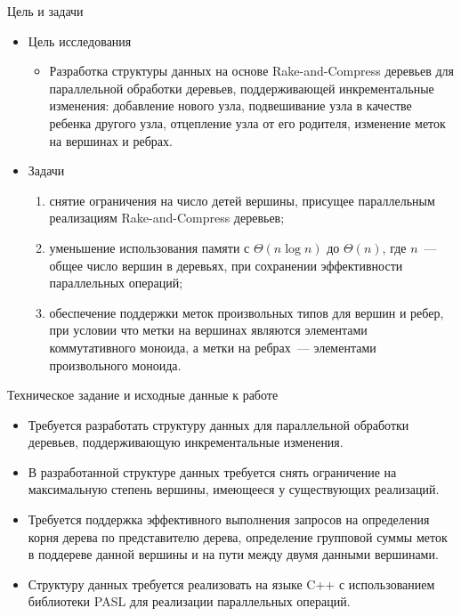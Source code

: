 \documentclass[hyperref=unicode,graphics=pdflatex,13pt]{beamer}
\begin{document}
\begin{frame}[shrink]{Цель и задачи}
\begin{itemize}
\item Цель исследования
\begin{itemize}
\item Разработка структуры данных на основе Rake-and-Compress деревьев для параллельной обработки деревьев, поддерживающей инкрементальные изменения: добавление нового узла, подвешивание узла в 
качестве ребенка другого узла, отцепление узла от его родителя, изменение меток на вершинах и ребрах.
 \end{itemize}
\end{itemize}

\begin{itemize} \item Задачи
\begin{enumerate}
    \item снятие ограничения на число детей вершины, присущее параллельным реализациям Rake-and-Compress деревьев;
    \item уменьшение использования памяти с $\Theta(n \log n)$ до $\Theta(n)$, где $n$~--- общее число вершин в деревьях, при сохранении эффективности параллельных операций;
    \item обеспечение поддержки меток произвольных типов для вершин и ребер, при условии что метки на вершинах являются элементами коммутативного моноида, а метки на ребрах~---
          элементами произвольного моноида.
\end{enumerate}
\end{itemize}
\end{frame}

\begin{frame}[shrink]{Техническое задание и исходные данные к работе}
\begin{itemize}
\item Требуется разработать структуру данных для параллельной обработки деревьев, поддерживающую инкрементальные изменения. 
\item В разработанной структуре данных требуется снять ограничение на максимальную степень вершины, имеющееся у существующих реализаций.
\item Требуется поддержка эффективного выполнения запросов на определения корня дерева по представителю дерева, определение групповой суммы меток в поддереве данной вершины и на пути между двумя данными вершинами. 
\item Структуру данных требуется реализовать на языке C++ с использованием библиотеки PASL для реализации параллельных операций.
\end{itemize}
\end{frame}
\end{document}
